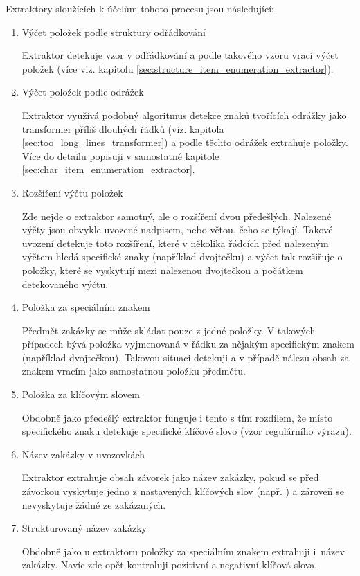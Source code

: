 \documentclass[thesis=M,czech]{FITthesis}[2019/12/23]
\begin{document}
\newpage
Extraktory sloužících k účelům tohoto procesu jsou následující:
\begin{enumerate}
    \item Výčet položek podle struktury odřádkování
    
    Extraktor detekuje vzor v odřádkování a podle takového vzoru vrací výčet položek (více viz. kapitolu \ref{sec:structure_item_enumeration_extractor}).
    
    \item Výčet položek podle odrážek
    
    Extraktor využívá podobný algoritmus detekce znaků tvořících odrážky jako transformer příliš dlouhých řádků (viz. kapitola \ref{sec:too_long_lines_transformer}) a podle těchto odrážek extrahuje položky. Více do detailu popisuji v samostatné kapitole \ref{sec:char_item_enumeration_extractor}.
    
    \item Rozšíření výčtu položek
    
    Zde nejde o extraktor samotný, ale o rozšíření dvou předešlých. Nalezené výčty jsou obvykle uvozené nadpisem, nebo větou, čeho se týkají. Takové uvození detekuje toto rozšíření, které v několika řádcích před nalezeným výčtem hledá specifické znaky (například dvojtečku) a výčet tak rozšiřuje o položky, které se vyskytují mezi nalezenou dvojtečkou a počátkem detekovaného výčtu.
    
    \item Položka za speciálním znakem
    
    Předmět zakázky se může skládat pouze z jedné položky. V takových případech bývá položka vyjmenovaná v řádku za nějakým specifickým znakem (například dvojtečkou). Takovou situaci detekuji a v případě nálezu obsah za znakem vracím jako samostatnou položku předmětu.
    
    \item Položka za klíčovým slovem
    
    Obdobně jako předešlý extraktor funguje i tento s tím rozdílem, že místo specifického znaku detekuje specifické klíčové slovo (vzor regulárního výrazu).
    
    \item Název zakázky v uvozovkách
    
    Extraktor extrahuje obsah závorek jako název zakázky, pokud se před závorkou vyskytuje jedno z nastavených klíčových slov (např. ) a zároveň se nevyskytuje žádné ze zakázaných.
    
    \item Strukturovaný název zakázky
    
    Obdobně jako u extraktoru položky za speciálním znakem extrahuji i~název zakázky. Navíc zde opět kontroluji pozitivní a negativní klíčová slova.
\end{enumerate}
\end{document}
